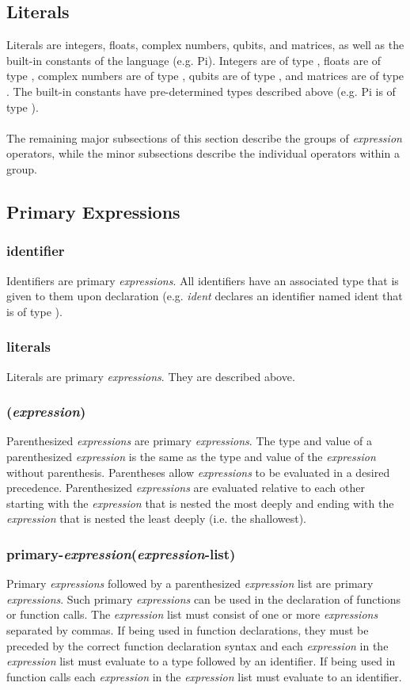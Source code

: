
\subsection{Literals}
Literals are integers, floats, complex numbers, qubits, and matrices, as well as the built-in constants of the language (e.g. \textsf{Pi}). Integers are of type \integ, floats are of type \float, complex numbers are of type \complex, qubits are of type \qubit, and matrices are of type \mat. The built-in constants have pre-determined types described above (e.g. \textsf{Pi} is of type \float).\\\\
The remaining major subsections of this section describe the groups of \textit{expression} operators, while the minor subsections describe the individual operators within a group.
\subsection{Primary Expressions}
\subsubsection{identifier}
Identifiers are primary \textit{expressions}. All identifiers have an associated type that is given to them upon declaration (e.g. \float \textit{ident} declares an identifier named ident that is of type \float).
\subsubsection{literals}
Literals are primary \textit{expressions}. They are described above.
\subsubsection{(\textit{expression})}
Parenthesized \textit{expressions} are primary \textit{expressions}. The type and value of a parenthesized \textit{expression} is the same as the type and value of the \textit{expression} without parenthesis. Parentheses allow \textit{expressions} to be evaluated in a desired precedence. Parenthesized \textit{expressions} are evaluated relative to each other starting with the \textit{expression} that is nested the most deeply and ending with the \textit{expression} that is nested the least deeply (i.e. the shallowest).
\subsubsection{primary-\textit{expression}(\textit{expression}-list)}
Primary \textit{expressions} followed by a parenthesized \textit{expression} list are primary \textit{expressions}. Such primary \textit{expressions} can be used in the declaration of functions or function calls. The \textit{expression} list must consist of one or more \textit{expressions} separated by commas. If being used in function declarations, they must be preceded by the correct function declaration syntax and each \textit{expression} in the \textit{expression} list must evaluate to a type followed by an identifier. If being used in function calls each \textit{expression} in the \textit{expression} list must evaluate to an identifier.

